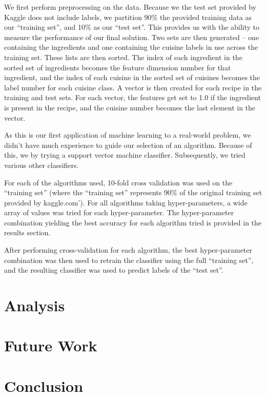 \documentclass[11pt]{article}
\begin{document}
We first perform preprocessing on the data.  Because we the test set
provided by Kaggle does not include labels, we partition 90\% the
provided training data as our ``training set'', and 10\% as our ``test
set''. This provides us with the ability to measure the performance of
our final solution.  Two sets are then generated -- one containing the
ingredients and one containing the cuisine labels in use across the
training set.  These lists are then sorted.  The index of each
ingredient in the sorted set of ingredients becomes the feature 
dimension number for that ingredient, and the index of each cuisine in
the sorted set of cuisines becomes the label number for each cuisine
class.  A vector is then created for each recipe in the training and
test sets.  For each vector, the features get set to 1.0 if the
ingredient is present in the recipe, and the cuisine number becomes
the last element in the vector.

As this is our first application of machine learning to a real-world
problem, we didn't have much experience to guide our selection of an
algorithm.  Because of this, we by trying a support vector machine
classifier.  Subsequently, we tried various other classifiers.

For each of the algorithms used, 10-fold cross validation was used on
the ``training set'' (where the ``training set'' represents 90\% of
the original training set provided by kaggle.com').  For all
algorithms taking hyper-parameters, a wide array of values was tried
for each hyper-parameter.  The hyper-parameter combination yielding
the best accuracy for each algorithm tried is provided in the results
section. 

After performing cross-validation for each algorithm, the best
hyper-parameter combination was then used to retrain the classifier
using the full ``training set'', and the resulting classifier was used
to predict labels of the ``test set''.





\section{Analysis}


\section{Future Work}


\section{Conclusion}





\end{document}
